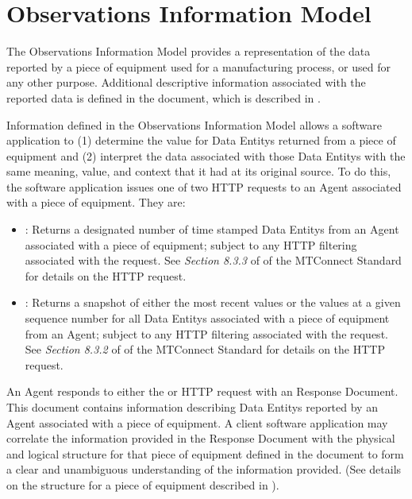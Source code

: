 
\section{Observations Information Model}
\label{sec:Observations Information Model}

The \gls{Observations Information Model} provides a representation of the data reported by a piece of equipment used for a manufacturing process, or used for any other purpose.  Additional descriptive information associated with the reported data is defined in the  document, which is described in .

Information defined in the \gls{Observations Information Model} allows a software application to (1) determine the value for \glspl{Data Entity} returned from a piece of equipment and (2) interpret the data associated with those \glspl{Data Entity} with the same meaning, value, and context that it had at its original source.  To do this, the software application issues one of two HTTP requests to an \gls{Agent} associated with a piece of equipment.  They are:


\begin{itemize}
\item {}:  Returns a designated number of time stamped \glspl{Data Entity} from an \gls{Agent} associated with a piece of equipment; subject to any HTTP filtering associated with the request.  See \textit{Section 8.3.3} of  of the MTConnect Standard for details on the  HTTP request.

\item {}:  Returns a snapshot of either the most recent values or the values at a given sequence number for all \glspl{Data Entity} associated with a piece of equipment from an \gls{Agent}; subject to any HTTP filtering associated with the request.  See \textit{Section 8.3.2} of  of the MTConnect Standard for details on the  HTTP request.
\end{itemize}

An \gls{Agent} responds to either the  or  HTTP request with an  \gls{Response Document}.  This document contains information describing \glspl{Data Entity} reported by an \gls{Agent} associated with a piece of equipment.   A client software application may correlate the information provided in the  \gls{Response Document} with the physical and logical structure for that piece of equipment defined in the  document to form a clear and unambiguous understanding of the information provided.  (See details on the structure for a piece of equipment described in ).

